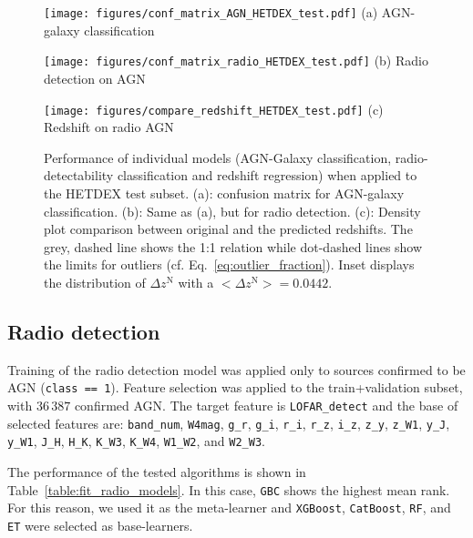 \documentclass{aa}
\begin{document}
\begin{figure}
  \centering
  \begin{minipage}{0.49\columnwidth}
    \centering
    \texttt{[image: figures/conf\_matrix\_AGN\_HETDEX\_test.pdf]}\hfill\break
    {(a) AGN-galaxy classification}
  \end{minipage}%
  \begin{minipage}{0.49\columnwidth}
    \centering
    \texttt{[image: figures/conf\_matrix\_radio\_HETDEX\_test.pdf]}\hfill\break
    {(b) Radio detection on AGN}
  \end{minipage}\hfill\break%
  \begin{minipage}{0.70\columnwidth}
    \centering
    \texttt{[image: figures/compare\_redshift\_HETDEX\_test.pdf]}\hfill\break
    {(c) Redshift on radio AGN}
  \end{minipage}%
  \caption{Performance of individual models (AGN-Galaxy classification, radio-detectability classification and redshift regression) when applied to the HETDEX test subset. (a): confusion matrix for AGN-galaxy classification. 
  (b): Same as (a), but for radio detection. (c): Density plot comparison between original and the predicted redshifts. 
  The grey, dashed line shows the 1:1 relation while dot-dashed lines show the limits for outliers (cf. Eq.~\ref{eq:outlier_fraction}). Inset displays the distribution of $\Delta z^{\mathrm{N}}$ with a ${{<}\Delta z^{\mathrm{N}}{>} = 0.0442}$.}
  \label{fig:results_models_test}
\end{figure}

\subsection{Radio detection}\label{sec:results_radio}

Training of the radio detection model was applied only to sources confirmed to be AGN (\texttt{class == 1}).
Feature selection was applied to the train+validation subset, with $36\,387$ confirmed AGN. 
The target feature is \verb|LOFAR_detect| and the base of selected features are:  \verb|band_num|, \verb|W4mag|, \verb|g_r|, \verb|g_i|, \verb|r_i|, \verb|r_z|, \verb|i_z|, \verb|z_y|, \verb|z_W1|, \verb|y_J|, \verb|y_W1|, \verb|J_H|, \verb|H_K|, \verb|K_W3|, \verb|K_W4|, \verb|W1_W2|, and \verb|W2_W3|.

The performance of the tested algorithms is shown in Table~\ref{table:fit_radio_models}. 
In this case, \verb|GBC| shows the highest mean rank. For this reason, we used it as the meta-learner and \verb|XGBoost|, \verb|CatBoost|, \verb|RF|, and \verb|ET| were selected as base-learners.
\end{document}
